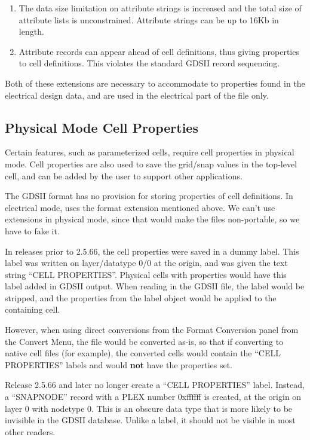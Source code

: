 \begin{enumerate}
\item The data size limitation on attribute strings is increased and the
total size of attribute lists is unconstrained.
Attribute strings can be up to 16Kb in length.

\item Attribute records can appear ahead of cell definitions, thus
giving properties to cell definitions.  This violates the standard
GDSII record sequencing.
\end{enumerate}

Both of these extensions are necessary to accommodate to properties found
in the electrical design data, and are used in the electrical part of
the file only.

\subsection{Physical Mode Cell Properties}

Certain features, such as parameterized cells, require cell properties
in physical mode.  Cell properties are also used to save the grid/snap
values in the top-level cell, and can be added by the user to support
other applications.

The GDSII format has no provision for storing properties of cell
definitions.  In electrical mode, {\Xic} uses the format extension
mentioned above.  We can't use extensions in physical mode, since that
would make the files non-portable, so we have to fake it.

In releases prior to 2.5.66, the cell properties were saved in a dummy
label.  This label was written on layer/datatype 0/0 at the origin,
and was given the text string ``{\vt CELL PROPERTIES}''.  Physical
cells with properties would have this label added in GDSII output. 
When reading in the GDSII file, the label would be stripped, and the
properties from the label object would be applied to the containing
cell.

However, when using direct conversions from the {\cb Format
Conversion} panel from the {\cb Convert Menu}, the file would be
converted as-is, so that if converting to {\Xic} native cell files
(for example), the converted cells would contain the ``{\vt CELL
PROPERTIES}'' labels and would {\bf not} have the properties set.

Release 2.5.66 and later no longer create a ``{\vt CELL
PROPERTIES}'' label.  Instead, a ``SNAPNODE'' record with a PLEX
number {\vt 0xffffff} is created, at the origin on layer 0 with
nodetype 0.  This is an obscure data type that is more likely to be
invisible in the GDSII database.  Unlike a label, it should not be
visible in most other readers.

